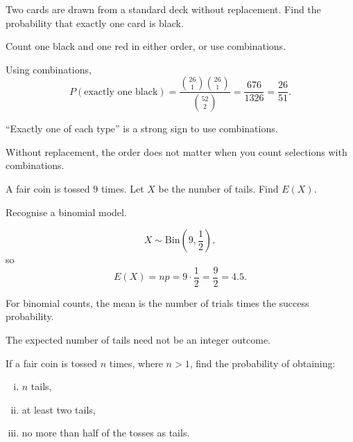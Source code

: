 \begin{problem}
Two cards are drawn from a standard deck without replacement. Find the probability that exactly one card is black.
\end{problem}

\begin{hint}
Count one black and one red in either order, or use combinations.
\end{hint}

\begin{solution}
Using combinations,
\[
P(\text{exactly one black})=\frac{\binom{26}{1}\binom{26}{1}}{\binom{52}{2}}
=\frac{676}{1326}=\frac{26}{51}.
\]
\end{solution}

\begin{takeaways}
\item ``Exactly one of each type'' is a strong sign to use combinations.
\item Without replacement, the order does not matter when you count selections with combinations.
\end{takeaways}

\begin{problem}
A fair coin is tossed $9$ times. Let $X$ be the number of tails. Find $E(X)$.
\end{problem}

\begin{hint}
Recognise a binomial model.
\end{hint}

\begin{solution}
\[
X\sim \mathrm{Bin}\left(9,\frac12\right),
\]
so
\[
E(X)=np=9\cdot \frac12=\frac92=4.5.
\]
\end{solution}

\begin{takeaways}
\item For binomial counts, the mean is the number of trials times the success probability.
\item The expected number of tails need not be an integer outcome.
\end{takeaways}

\begin{problem}
If a fair coin is tossed $n$ times, where $n>1$, find the probability of obtaining:
\begin{enumerate}[(i)]
  \item $n$ tails,
  \item at least two tails,
  \item no more than half of the tosses as tails.
\end{enumerate}
\end{problem}

